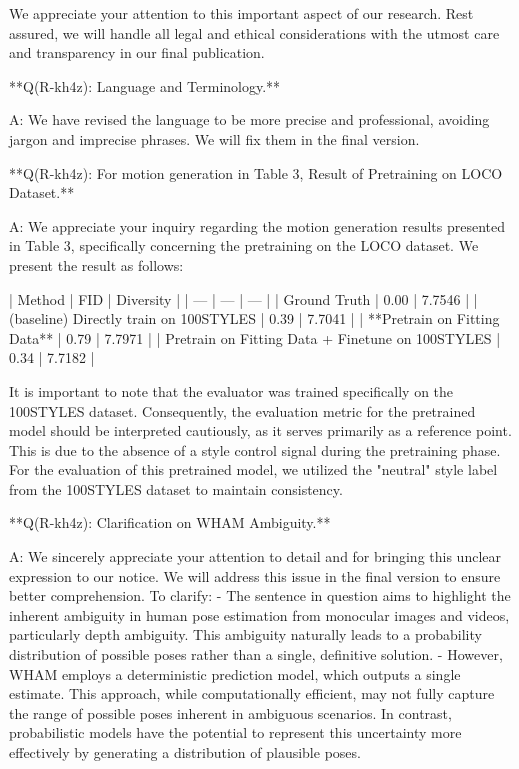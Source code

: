 We appreciate your attention to this important aspect of our research. Rest assured, we will handle all legal and ethical considerations with the utmost care and transparency in our final publication.



**Q(R-kh4z): Language and Terminology.**

A: We have revised the language to be more precise and professional, avoiding jargon and imprecise phrases. We will fix them in the final version.

**Q(R-kh4z): For motion generation in Table 3, Result of Pretraining on LOCO Dataset.**

A: We appreciate your inquiry regarding the motion generation results presented in Table 3, specifically concerning the pretraining on the LOCO dataset. We present the result as follows:

| Method | FID | Diversity |
| --- | --- | --- |
| Ground Truth | 0.00 | 7.7546 |
| (baseline) Directly train on 100STYLES | 0.39 | 7.7041 |
| **Pretrain on Fitting Data** | 0.79 | 7.7971 |
| Pretrain on Fitting Data + Finetune on 100STYLES | 0.34 | 7.7182 |

It is important to note that the evaluator was trained specifically on the 100STYLES dataset. Consequently, the evaluation metric for the pretrained model should be interpreted cautiously, as it serves primarily as a reference point. This is due to the absence of a style control signal during the pretraining phase. For the evaluation of this pretrained model, we utilized the "neutral" style label from the 100STYLES dataset to maintain consistency.



**Q(R-kh4z): Clarification on WHAM Ambiguity.**

A: We sincerely appreciate your attention to detail and for bringing this unclear expression to our notice. We will address this issue in the final version to ensure better comprehension. To clarify:
- The sentence in question aims to highlight the inherent ambiguity in human pose estimation from monocular images and videos, particularly depth ambiguity. This ambiguity naturally leads to a probability distribution of possible poses rather than a single, definitive solution.
- However, WHAM employs a deterministic prediction model, which outputs a single estimate. This approach, while computationally efficient, may not fully capture the range of possible poses inherent in ambiguous scenarios. In contrast, probabilistic models have the potential to represent this uncertainty more effectively by generating a distribution of plausible poses.

